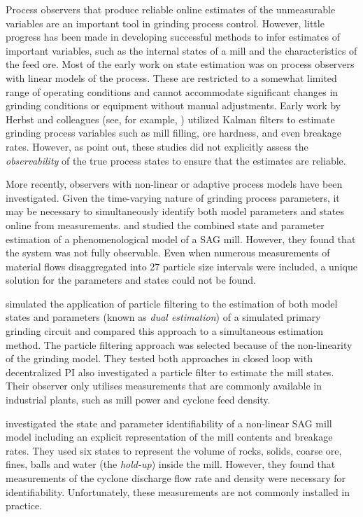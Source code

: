 Process observers that produce reliable online estimates of the unmeasurable variables are an important tool in grinding process control. However, little progress has been made in developing successful methods to infer estimates of important variables, such as the internal states of a mill and the characteristics of the feed ore. Most of the early work on state estimation was on process observers with linear models of the process. These are restricted to a somewhat limited range of operating conditions and cannot accommodate significant changes in grinding conditions or equipment without manual adjustments. Early work by Herbst and colleagues (see, for example, \cite{herbst_model-based_1992}) utilized Kalman filters to estimate grinding process variables such as mill filling, ore hardness, and even breakage rates. However, as \cite{le_roux_ekf_2017} point out, these studies did not explicitly assess the \textit{observability} of the true process states to ensure that the estimates are reliable.

More recently, observers with non-linear or adaptive process models have been investigated. Given the time-varying nature of grinding process parameters, it may be necessary to simultaneously identify both model parameters and states online from measurements. \cite{apelt_inferential_2002} and \cite{apelt_inferential_2002-1} studied the combined state and parameter estimation of a phenomenological model of a \acrshort{SAG} mill. However, they found that the system was not fully observable. Even when numerous measurements of material flows disaggregated into 27 particle size intervals were included, a unique solution for the parameters and states could not be found.

\cite{olivier_dual_2012} simulated the application of particle filtering to the estimation of both model states and parameters (known as \textit{dual estimation}) of a simulated primary grinding circuit and compared this approach to a simultaneous estimation method. The particle filtering approach was selected because of the non-linearity of the grinding model. They tested both approaches in closed loop with decentralized \gls{PI} \cite{le_roux_throughput_2016} also investigated a particle filter to estimate the mill states. Their observer only utilises measurements that are commonly available in industrial plants, such as mill power and cyclone feed density.

\cite{le_roux_state_2016} investigated the state and parameter identifiability of a non-linear \acrshort{SAG} mill model including an explicit representation of the mill contents and breakage rates. They used six states to represent the volume of rocks, solids, coarse ore, fines, balls and water (the \textit{hold-up}) inside the mill. However, they found that measurements of the cyclone discharge flow rate and density were necessary for identifiability. Unfortunately, these measurements are not commonly installed in practice.

